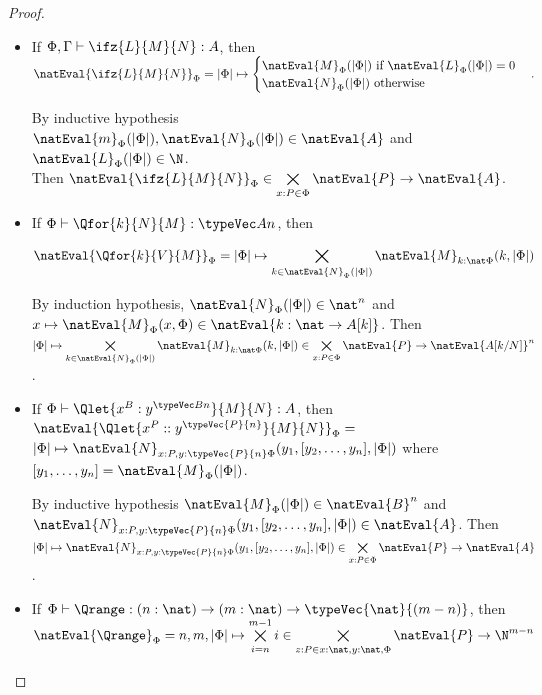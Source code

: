 \begin{proof}
\begin{itemize}
        \item If $\Phi, \Gamma \vdash \ifz{L}{M}{N} : A$, then \\
        $\natEval{\ifz{L}{M}{N}}_\Phi = |\Phi| \mapsto \begin{cases}
            \natEval{M}_\Phi(|\Phi|) \text{ if } \natEval{L}_\Phi(|\Phi|) = 0 \\
            \natEval{N}_\Phi(|\Phi|) \text{ otherwise}
        \end{cases}.$

        By inductive hypothesis $\natEval{m}_\Phi(|\Phi|),\natEval{N}_\Phi(|\Phi|)\in\natEval{A}$ and $\natEval{L}_\Phi(|\Phi|)\in\N$. \\
        Then $\natEval{\ifz{L}{M}{N}}_\Phi\in\bigtimes\limits_{x:P \in \Phi} \natEval{P} \to \natEval{A}$.

        \item If $\Phi\vdash \Qfor{k}{N}{M} : \typeVec A n$, then
        
        \[
        \natEval{\Qfor{k}{V}{M}}_\Phi = |\Phi| \mapsto \bigtimes\limits_{k\in
        \natEval{N}_\Phi(|\Phi|)} \natEval{M}_{k:\nat\Phi}(k, |\Phi|)
        \]

        By induction hypothesis, $\natEval{N}_\Phi(|\Phi|)\in \nat^n$ and
        $x\mapsto\natEval{M}_\Phi(x, \Phi)\in \natEval{k:\nat\to A[k]}$. Then $|\Phi|
        \mapsto \bigtimes\limits_{k\in \natEval{N}_\Phi(|\Phi|)} \natEval{M}_{k:\nat\Phi}(k,
        |\Phi|)\in\bigtimes\limits_{x:P \in \Phi} \natEval{P} \to\natEval{A[k/N]}^n$.

        \item If $\Phi\vdash \Qlet{x^B : y^{\typeVec B n}}{M}{N}:A$, then
        $\natEval{\Qlet{x^P :: y^{\typeVec{P}{n}}}{M}{N}}_\Phi =$\allowbreak
        $|\Phi|\mapsto \natEval{N}_{x:P, y:\typeVec{P}{n}\Phi}(y_1,[y_2,\dots,y_n],|\Phi|)$ where $[y_1,\dots,y_n] = \natEval{M}_\Phi(|\Phi|)$.
        
        By inductive hypothesis
        $\natEval{M}_\Phi(|\Phi|)\in \natEval{B}^n$ and $\natEval{N}_{x:P, y:\typeVec{P}{n}
        \Phi}(y_1,[y_2,\dots,y_n],|\Phi|)\in\natEval{A}$. Then $|\Phi|\mapsto
        \natEval{N}_{x:P, y:\typeVec{P}{n}
        \Phi}(y_1,[y_2,\dots,y_n],|\Phi|)\in\bigtimes\limits_{x:P \in \Phi} \natEval{P}
        \to \natEval{A}$.

        \item If $\Phi\vdash \Qrange : (n:\nat)\to (m:\nat)\to \typeVec{\nat}{(m-n)}$, then $\natEval{\Qrange}_\Phi = n,m,|\Phi| \mapsto \bigtimes\limits_{i=n}^{m-1} i\in \bigtimes\limits_{z:P \in x:\nat,y:\nat,\Phi} \natEval{P} \to \N^{m-n}$
    \end{itemize}
\end{proof}

